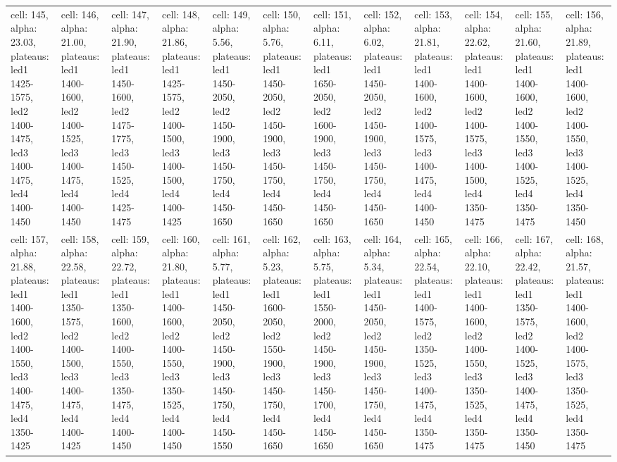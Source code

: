 \documentclass{article}
\begin{document}
\begin{landscape}
\begin{longtable}{|p{1.5cm}|p{1.5cm}|p{1.5cm}|p{1.5cm}|p{1.5cm}|p{1.5cm}|p{1.5cm}|p{1.5cm}|p{1.5cm}|p{1.5cm}|p{1.5cm}|p{1.5cm}|}
\rowcolor{lightgray} cell: 145, alpha: 23.03, plateaus: led1 1425-1575, led2 1400-1475, led3 1400-1475, led4 1400-1450 &cell: 146, alpha: 21.00, plateaus: led1 1400-1600, led2 1400-1525, led3 1400-1475, led4 1400-1450 &cell: 147, alpha: 21.90, plateaus: led1 1450-1600, led2 1475-1775, led3 1450-1525, led4 1425-1475 &cell: 148, alpha: 21.86, plateaus: led1 1425-1575, led2 1400-1500, led3 1400-1500, led4 1400-1425 &cell: 149, alpha: 5.56, plateaus: led1 1450-2050, led2 1450-1900, led3 1450-1750, led4 1450-1650 &cell: 150, alpha: 5.76, plateaus: led1 1450-2050, led2 1450-1900, led3 1450-1750, led4 1450-1650 &cell: 151, alpha: 6.11, plateaus: led1 1650-2050, led2 1600-1900, led3 1450-1750, led4 1450-1650 &cell: 152, alpha: 6.02, plateaus: led1 1450-2050, led2 1450-1900, led3 1450-1750, led4 1450-1650 &cell: 153, alpha: 21.81, plateaus: led1 1400-1600, led2 1400-1575, led3 1400-1475, led4 1400-1450 &cell: 154, alpha: 22.62, plateaus: led1 1400-1600, led2 1400-1575, led3 1400-1500, led4 1350-1475 &cell: 155, alpha: 21.60, plateaus: led1 1400-1600, led2 1400-1550, led3 1400-1525, led4 1350-1475 &cell: 156, alpha: 21.89, plateaus: led1 1400-1600, led2 1400-1550, led3 1400-1525, led4 1350-1450 \\
cell: 157, alpha: 21.88, plateaus: led1 1400-1600, led2 1400-1550, led3 1400-1475, led4 1350-1425 &cell: 158, alpha: 22.58, plateaus: led1 1350-1575, led2 1400-1500, led3 1400-1475, led4 1400-1425 &cell: 159, alpha: 22.72, plateaus: led1 1350-1600, led2 1400-1550, led3 1350-1475, led4 1400-1450 &cell: 160, alpha: 21.80, plateaus: led1 1400-1600, led2 1400-1550, led3 1350-1525, led4 1400-1450 &cell: 161, alpha: 5.77, plateaus: led1 1450-2050, led2 1450-1900, led3 1450-1750, led4 1450-1550 &cell: 162, alpha: 5.23, plateaus: led1 1600-2050, led2 1550-1900, led3 1450-1750, led4 1450-1650 &cell: 163, alpha: 5.75, plateaus: led1 1550-2000, led2 1450-1900, led3 1450-1700, led4 1450-1650 &cell: 164, alpha: 5.34, plateaus: led1 1450-2050, led2 1450-1900, led3 1450-1750, led4 1450-1650 &cell: 165, alpha: 22.54, plateaus: led1 1400-1575, led2 1350-1525, led3 1400-1475, led4 1350-1475 &cell: 166, alpha: 22.10, plateaus: led1 1400-1600, led2 1400-1550, led3 1350-1525, led4 1350-1475 &cell: 167, alpha: 22.42, plateaus: led1 1350-1575, led2 1400-1525, led3 1400-1475, led4 1350-1450 &cell: 168, alpha: 21.57, plateaus: led1 1400-1600, led2 1400-1575, led3 1350-1525, led4 1350-1475 \\

\end{longtable}
\end{landscape}
\end{document}
